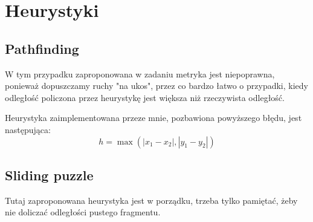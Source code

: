 \documentclass{article}
\begin{document}
\section{Heurystyki}
\subsection{Pathfinding}
W tym przypadku zaproponowana w zadaniu metryka jest niepoprawna, ponieważ dopuszczamy ruchy "na ukos", przez co bardzo łatwo
o przypadki, kiedy odległość policzona przez heurystykę jest większa niż rzeczywista odległość.

Heurystyka zaimplementowana przeze mnie, pozbawiona powyższego błędu, jest następująca:
$$h= \max(|x_1 - x_2|, |y_1 - y_2|)$$

\subsection{Sliding puzzle}
Tutaj zaproponowana heurystyka jest w porządku, trzeba tylko pamiętać, żeby nie doliczać odległości pustego fragmentu.
\end{document}
